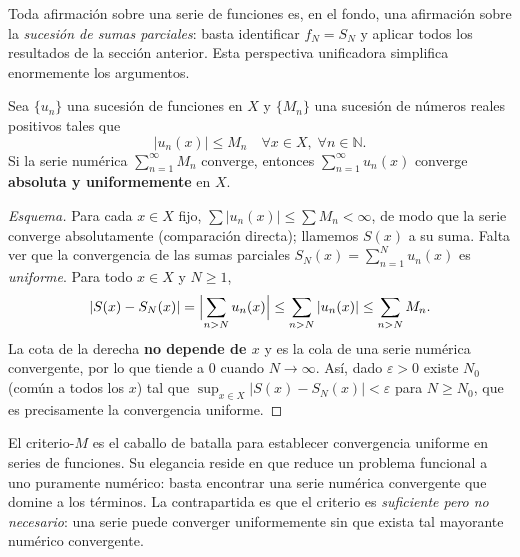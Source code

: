 \begin{rem}
Toda afirmación sobre una serie de funciones es, en el fondo, una
afirmación sobre la \emph{sucesión de sumas parciales}: basta
identificar $f_N = S_N$ y aplicar todos los resultados de la sección
anterior. Esta perspectiva unificadora simplifica enormemente los
argumentos.
\end{rem}

\begin{theorem}
\label{thm:weierstrass_M}
Sea $\{u_n\}$ una sucesión de funciones en $X$ y $\{M_n\}$ una
sucesión de números reales positivos tales que
\[
    |u_n(x)| \leq M_n \quad \forall x \in X,\;\forall n \in \mathbb{N}.
\]
Si la serie numérica $\sum_{n=1}^\infty M_n$ converge, entonces
$\sum_{n=1}^\infty u_n(x)$ converge \textbf{absoluta y uniformemente}
en $X$.
\end{theorem}

\begin{proof}[Esquema]
Para cada $x\in X$ fijo, $\sum|u_n(x)|\leq\sum M_n<\infty$, de modo que la serie
converge absolutamente (comparación directa); llamemos $S(x)$ a su suma. Falta
ver que la convergencia de las sumas parciales $S_N(x)=\sum_{n=1}^N u_n(x)$ es
\emph{uniforme}. Para todo $x\in X$ y $N\geq 1$,
\[
  |S(x)-S_N(x)|=\Bigl|\sum_{n>N}u_n(x)\Bigr|
  \leq\sum_{n>N}|u_n(x)|\leq\sum_{n>N}M_n.
\]
La cota de la derecha \textbf{no depende de $x$} y es la cola de una serie
numérica convergente, por lo que tiende a $0$ cuando $N\to\infty$. Así, dado
$\varepsilon>0$ existe $N_0$ (común a todos los $x$) tal que
$\sup_{x\in X}|S(x)-S_N(x)|<\varepsilon$ para $N\geq N_0$, que es precisamente
la convergencia uniforme.
\end{proof}

\begin{rem}
El criterio-$M$ es el caballo de batalla para establecer convergencia
uniforme en series de funciones. Su elegancia reside en que reduce
un problema funcional a uno puramente numérico: basta encontrar una
serie numérica convergente que domine a los términos. La contrapartida
es que el criterio es \emph{suficiente pero no necesario}: una serie
puede converger uniformemente sin que exista tal mayorante numérico
convergente.
\end{rem}

